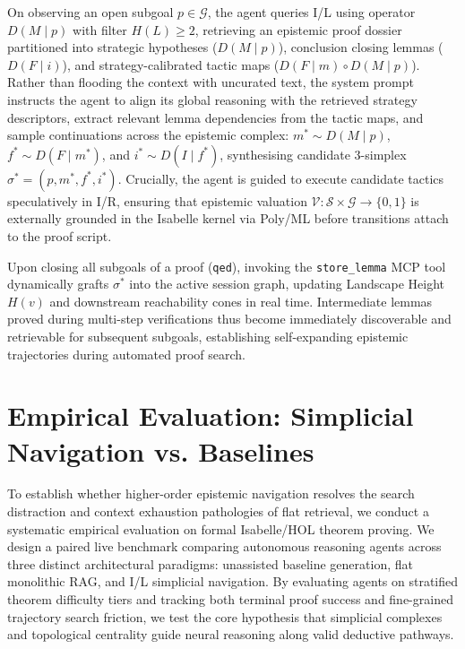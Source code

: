 \documentclass{svproc}
\begin{document}
\medskip\noindent On observing an open subgoal $p \in \mathcal{G}$, the agent queries I/L using operator $D(M \mid p)$ with filter $H(L) \ge 2$, retrieving an epistemic proof dossier partitioned into strategic hypotheses ($D(M \mid p)$), conclusion closing lemmas ($D(F \mid i)$), and strategy-calibrated tactic maps ($D(F \mid m) \circ D(M \mid p)$). Rather than flooding the context with uncurated text, the system prompt instructs the agent to align its global reasoning with the retrieved strategy descriptors, extract relevant lemma dependencies from the tactic maps, and sample continuations across the epistemic complex: $m^* \sim D(M \mid p)$, $f^* \sim D(F \mid m^*)$, and $i^* \sim D(I \mid f^*)$, synthesising candidate 3-simplex $\sigma^* = (p, m^*, f^*, i^*)$. Crucially, the agent is guided to execute candidate tactics speculatively in I/R, ensuring that epistemic valuation $\mathcal{V} : \mathcal{S} \times \mathcal{G} \to \{0, 1\}$ is externally grounded in the Isabelle kernel via Poly/ML before transitions attach to the proof script.

\medskip\noindent Upon closing all subgoals of a proof (\texttt{qed}), invoking the \texttt{store\_lemma} MCP tool dynamically grafts $\sigma^*$ into the active session graph, updating Landscape Height $H(v)$ and downstream reachability cones in real time. Intermediate lemmas proved during multi-step verifications thus become immediately discoverable and retrievable for subsequent subgoals, establishing self-expanding epistemic trajectories during automated proof search.

\section{Empirical Evaluation: Simplicial Navigation vs. Baselines}\label{sec:experiments}
\enlargethispage{\baselineskip}

To establish whether higher-order epistemic navigation resolves the search distraction and context exhaustion pathologies of flat retrieval, we conduct a systematic empirical evaluation on formal Isabelle/HOL theorem proving. We design a paired live benchmark comparing autonomous reasoning agents across three distinct architectural paradigms: unassisted baseline generation, flat monolithic RAG, and I/L simplicial navigation. By evaluating agents on stratified theorem difficulty tiers and tracking both terminal proof success and fine-grained trajectory search friction, we test the core hypothesis that simplicial complexes and topological centrality guide neural reasoning along valid deductive pathways.
\end{document}
